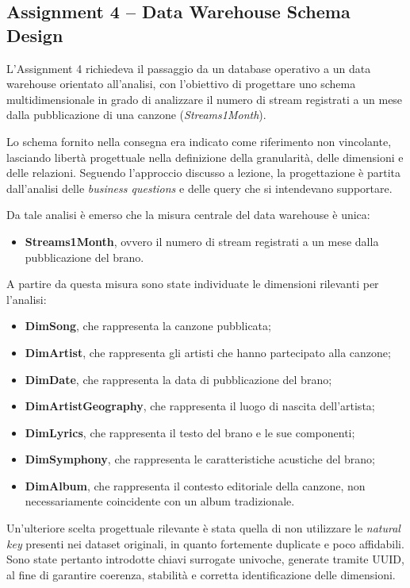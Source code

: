 \subsection*{Assignment 4 -- Data Warehouse Schema Design}

L’Assignment 4 richiedeva il passaggio da un database operativo a un
data warehouse orientato all’analisi, con l’obiettivo di progettare
uno schema multidimensionale in grado di analizzare il numero di stream
registrati a un mese dalla pubblicazione di una canzone
(\textit{Streams1Month}).

Lo schema fornito nella consegna era indicato come riferimento non vincolante,
lasciando libertà progettuale nella definizione della granularità,
delle dimensioni e delle relazioni. Seguendo l’approccio discusso a lezione,
la progettazione è partita dall’analisi delle \textit{business questions}
e delle query che si intendevano supportare.

Da tale analisi è emerso che la misura centrale del data warehouse è unica:
\begin{itemize}
    \item \textbf{Streams1Month}, ovvero il numero di stream registrati a un mese
    dalla pubblicazione del brano.
\end{itemize}

A partire da questa misura sono state individuate le dimensioni rilevanti
per l’analisi:
\begin{itemize}
    \item \textbf{DimSong}, che rappresenta la canzone pubblicata;
    \item \textbf{DimArtist}, che rappresenta gli artisti che hanno partecipato
    alla canzone;
    \item \textbf{DimDate}, che rappresenta la data di pubblicazione del brano;
    \item \textbf{DimArtistGeography}, che rappresenta il luogo di nascita
    dell’artista;
    \item \textbf{DimLyrics}, che rappresenta il testo del brano e le sue componenti;
    \item \textbf{DimSymphony}, che rappresenta le caratteristiche acustiche
    del brano;
    \item \textbf{DimAlbum}, che rappresenta il contesto editoriale della canzone,
    non necessariamente coincidente con un album tradizionale.
\end{itemize}

Un’ulteriore scelta progettuale rilevante è stata quella di non utilizzare
le \textit{natural key} presenti nei dataset originali, in quanto fortemente
duplicate e poco affidabili. Sono state pertanto introdotte chiavi surrogate
univoche, generate tramite UUID, al fine di garantire coerenza, stabilità
e corretta identificazione delle dimensioni.

